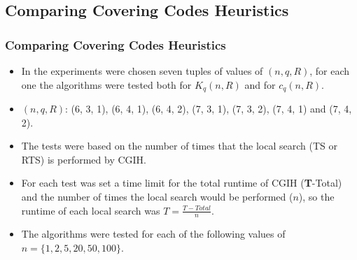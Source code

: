 \documentclass{beamer}
\begin{document}
\subsection{Comparing Covering Codes Heuristics}

\begin{frame}
  \frametitle{Comparing Covering Codes Heuristics}
{
	
\begin{itemize}
	\item<1-> In the experiments were chosen seven tuples of values of $(n,q,R)$, for each one the algorithms were tested both for $K_{q}(n, R)$ and for $c_{q}(n,R)$.
	\item<2-> $(n,q,R)$: (6, 3, 1), (6, 4, 1), (6, 4, 2), (7, 3, 1), (7, 3, 2), (7, 4, 1) and (7, 4, 2).
	\item<3-> The tests were based on the number of times that the local search (TS or RTS) is performed by CGIH. 
	\item<4-> For each test was set a time limit for the total runtime of CGIH (\textbf{T}-Total) and the number of times the local search would be performed ($n$), so the runtime of each local search was $T = \frac{T-Total}{n}$.
	\item<5-> The algorithms were tested for each of the following values of $n = \{1, 2, 5, 20, 50, 100\}$.
\end{itemize}

}
\end{frame}
\end{document}
